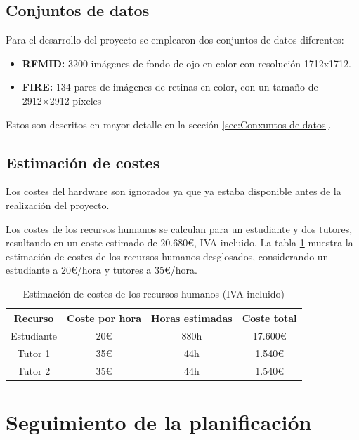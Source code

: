 \subsection{Conjuntos de datos}
\label{subsec:Conxuntos de datos}
Para el desarrollo del proyecto se emplearon dos conjuntos de datos diferentes:

\begin{itemize}
    \item \textbf{RFMID:} 3200 imágenes de fondo de ojo en color con resolución 1712x1712.
    \item \textbf{FIRE:} 134 pares de imágenes de retinas en color, con un tamaño de 2912×2912 píxeles
\end{itemize}

Estos son descritos en mayor detalle en la sección \ref{sec:Conxuntos de datos}.

\subsection{Estimación de costes}
\label{subsec:Estimación de custos}

Los costes del hardware son ignorados ya que ya estaba disponible antes de la realización del proyecto.

Los costes de los recursos humanos se calculan para un estudiante y dos tutores, resultando en un coste estimado de 20.680€, IVA incluido. La tabla \ref{tab:estimacion_custos} muestra la estimación de costes de los recursos humanos desglosados, considerando un estudiante a 20€/hora y tutores a 35€/hora.

\begin{table}[h]
\centering
\begin{tabular}{|c|c|c|c|}
\hline
\textbf{Recurso} & \textbf{Coste por hora} & \textbf{Horas estimadas} & \textbf{Coste total} \\ \hline
Estudiante & 20€ & 880h & 17.600€ \\ \hline
Tutor 1 & 35€ & 44h & 1.540€ \\ \hline
Tutor 2 & 35€ & 44h & 1.540€ \\ \hline
\end{tabular}
\caption{Estimación de costes de los recursos humanos (IVA incluido)}
\label{tab:estimacion_custos}
\end{table}

\section{Seguimiento de la planificación}
\label{sec:Seguimento da planificación}

